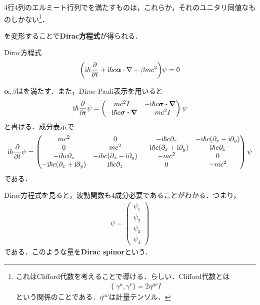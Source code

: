 \documentclass{report}
\begin{document}
4行4列のエルミート行列でを満たすものは，これらか，それのユニタリ同値なものしかない\footnote{
  これはClifford代数を考えることで導ける．らしい．Clifford代数とは
\begin{align}
  \{\ \gamma^\mu, \gamma^\nu\} = 2\eta^{\mu\nu} I
\end{align}
という関係のことである．$\eta^{\mu\nu}$は計量テンソル．
}．

を変形することで\textbf{Dirac方程式}が得られる．
\begin{itembox}[l]{Dirac方程式}
\begin{align}
  \qty(\mathrm{i}\hbar \frac{\partial}{\partial t} + \mathrm{i} \hbar c \bm{\alpha}\cdot \nabla - \beta mc^2)\psi = 0
\end{align}
\end{itembox}
$\bm{\alpha},\beta$はを満たす．また，Dirac-Pauli表示を用いると
\begin{align}
  \mathrm{i}\hbar \frac{\partial}{\partial t}\psi = 
  \begin{pmatrix}
    mc^2 I & -\mathrm{i}\hbar c \bm{\sigma\cdot\nabla}\\
    -\mathrm{i}\hbar c \bm{\sigma\cdot\nabla} & -mc^2 I
  \end{pmatrix}
  \psi
\end{align}
と書ける．成分表示で
\begin{align}
  \label{dirac-eq-matrix}
  \mathrm{i}\hbar\frac{\partial}{\partial t}\psi =
  \begin{pmatrix}
    mc^2 & 0 & -\mathrm{i}\hbar c\partial_z & -\mathrm{i}\hbar c(\partial_x -\mathrm{i} \partial_y)\\
    0 & mc^2 & -\mathrm{i}\hbar c(\partial_x +\mathrm{i} \partial_y) & \mathrm{i}\hbar c\partial_z \\
    -\mathrm{i}\hbar c\partial_z & -\mathrm{i}\hbar c(\partial_x -\mathrm{i} \partial_y) & -mc^2 & 0\\
    -\mathrm{i}\hbar c(\partial_x +\mathrm{i} \partial_y) & \mathrm{i}\hbar c\partial_z & 0 & -mc^2
  \end{pmatrix}
  \psi
\end{align}
である．

Dirac方程式を見ると，波動関数も4成分必要であることがわかる．つまり，
\begin{align}
  \psi = 
  \begin{pmatrix}
    \psi_1\\\psi_2\\\psi_3\\\psi_4
  \end{pmatrix}
\end{align}
である．このような量を\textbf{Dirac spinor}という．
\end{document}
